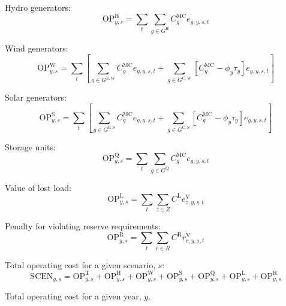 \documentclass{article}
\newcommand{\sGeneratorsExistingWind}{G^{\mathrm{E,W}}}
\newcommand{\sGeneratorsExistingSolar}{G^{\mathrm{E,S}}}
\newcommand{\sGeneratorsCandidateWind}{G^{\mathrm{C,W}}}
\newcommand{\sGeneratorsCandidateSolar}{G^{\mathrm{C,S}}}
\newcommand{\sGeneratorsHydro}{G^{\mathrm{H}}}
\newcommand{\sStorage}{G^{\mathrm{Q}}}
\newcommand{\sZones}{Z}
\newcommand{\sRegions}{R}
\newcommand{\iGenerator}{g}
\newcommand{\iYear}{y}
\newcommand{\iScenario}{s}
\newcommand{\iInterval}{t}
\newcommand{\iZone}{z}
\newcommand{\iRegion}{r}
\newcommand{\cOperatingCostThermal}[1][\iYear,\iScenario]{\mathrm{OP}^{\mathrm{T}}_{#1}}
\newcommand{\cOperatingCostHydro}[1][\iYear,\iScenario]{\mathrm{OP}^{\mathrm{H}}_{#1}}
\newcommand{\cOperatingCostWind}[1][\iYear,\iScenario]{\mathrm{OP}^{\mathrm{W}}_{#1}}
\newcommand{\cOperatingCostSolar}[1][\iYear,\iScenario]{\mathrm{OP}^{\mathrm{S}}_{#1}}
\newcommand{\cOperatingCostStorage}[1][\iYear,\iScenario]{\mathrm{OP}^{\mathrm{Q}}_{#1}}
\newcommand{\cMarginalCost}[1][\iGenerator,\iYear]{C^{\mathrm{MC}}_{#1}}
\newcommand{\cOperatingCostLostLoad}[1][\iYear,\iScenario]{\mathrm{OP}^{\mathrm{L}}_{#1}}
\newcommand{\cLostLoadCost}{C^{\mathrm{L}}}
\newcommand{\cReserveUpViolationPenalty}{C^{\mathrm{R}}}
\newcommand{\cOperatingCostReserveUpViolation}[1][\iYear,\iScenario]{\mathrm{OP}^{\mathrm{R}}_{#1}}
\newcommand{\cOperatingCostScenario}[1][\iYear,\iScenario]{\mathrm{SCEN}_{#1}}
\newcommand{\vBaseline}[1][\iYear]{\phi_{#1}}
\newcommand{\vPermitPrice}[1][\iYear]{\tau_{#1}}
\newcommand{\vEnergy}[1][\iGenerator,\iYear,\iScenario,\iInterval]{e_{#1}}
\newcommand{\vReserveUpViolation}[1][\iRegion,\iYear,\iScenario,\iInterval]{r^{\mathrm{V}}_{#1}}
\newcommand{\vLostLoadEnergy}[1][\iZone,\iYear,\iScenario,\iInterval]{e^{\mathrm{V}}_{#1}}
\begin{document}
Hydro generators:
\begin{equation}
\cOperatingCostHydro = \sum\limits_{\iInterval}\sum\limits_{\iGenerator \in \sGeneratorsHydro}\cMarginalCost[\iGenerator] \vEnergy
\end{equation}

Wind generators:
\begin{equation}
\cOperatingCostWind = \sum\limits_{\iInterval}\left[\sum\limits_{\iGenerator \in \sGeneratorsExistingWind} \cMarginalCost[\iGenerator] \vEnergy + \sum\limits_{\iGenerator \in \sGeneratorsCandidateWind} \left[\cMarginalCost[\iGenerator] - \vBaseline \vPermitPrice\right] \vEnergy\right]
\end{equation}

Solar generators:
\begin{equation}
\cOperatingCostSolar = \sum\limits_{\iInterval}\left[\sum\limits_{\iGenerator \in \sGeneratorsExistingSolar} \cMarginalCost[\iGenerator] \vEnergy + \sum\limits_{\iGenerator \in \sGeneratorsCandidateSolar} \left[\cMarginalCost[\iGenerator] - \vBaseline\vPermitPrice\right] \vEnergy\right]
\end{equation}

Storage units:
\begin{equation}
\cOperatingCostStorage = \sum\limits_{\iInterval}\sum\limits_{\iGenerator \in \sStorage} \cMarginalCost[\iGenerator] \vEnergy
\end{equation}

Value of lost load:
\begin{equation}
\cOperatingCostLostLoad = \sum\limits_{\iInterval}\sum\limits_{\iZone \in \sZones} \cLostLoadCost \vLostLoadEnergy
\end{equation}

Penalty for violating reserve requirements:
\begin{equation}
\cOperatingCostReserveUpViolation = \sum\limits_{\iInterval}\sum\limits_{\iRegion \in \sRegions} \cReserveUpViolationPenalty \vReserveUpViolation
\end{equation}

Total operating cost for a given scenario, $\iScenario$:
\begin{equation}
\cOperatingCostScenario = \cOperatingCostThermal + \cOperatingCostHydro + \cOperatingCostWind + \cOperatingCostSolar + \cOperatingCostStorage + \cOperatingCostLostLoad + \cOperatingCostReserveUpViolation
\end{equation}

Total operating cost for a given year, $\iYear$.
\end{document}
